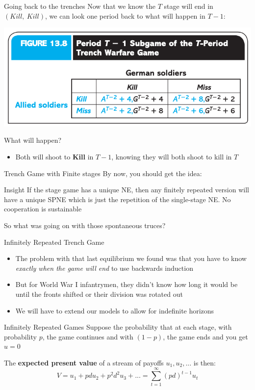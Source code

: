 \begin{frame}{Going back to the trenches}
  Now that we know the $T$ stage will end in $(Kill, ~Kill)$, we can look one period back to what will happen in $T-1$: 
  \begin{center}
    \includegraphics[width=.7\textwidth]{figures/fig138.png}
  \end{center}
  What will happen?
  \pause
  \begin{itemize}
      \item Both will shoot to \textbf{Kill} in $T-1$, knowing they will both shoot to kill in $T$
  \end{itemize}
\end{frame}

\begin{frame}{Trench Game with Finite stages}
  By now, you should get the idea:
  \begin{block}{Insight}
    If the stage game has a unique NE, then any finitely repeated version will have a unique SPNE which is just the repetition of the single-stage NE. No cooperation is sustainable 
  \end{block}

  So what was going on with those spontaneous truces?
\end{frame}

\begin{frame}{Infinitely Repeated Trench Game}
  \begin{itemize}
    \item The problem with that last equilibrium we found was that you have to know \textit{exactly when the game will end} to use backwards induction 
    \item But for World War I infantrymen, they didn't know how long it would be until the fronts shifted or their division was rotated out
    \item We will have to extend our models to allow for \alert{indefinite horizons}
  \end{itemize} 
\end{frame}

\begin{frame}{Infinitely Repeated Games}
  Suppose the probability that at each stage, with probability $p$, the game continues and with $(1-p)$, the game ends and you get $u=0$

  The \textbf{expected present value} of a stream of payoffs $u_1, u_2, ...$ is then:
  $$ V = u_1 + p d u_2 + p^2 d^2 u_3 + ... = \sum_{t=1}^{\infty}(pd)^{t-1}u_t $$
\end{frame}

